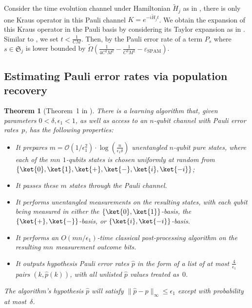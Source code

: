 \documentclass[twocolumn,superscriptaddress,aps,showpacs,amsmath,amstex,amssymb,citeautoscript,floatfix,pra,preprintnumbers]{revtex4-2}
\newcounter{alg}
\newtheorem{theorem}{Theorem}
\theoremstyle{plain}
\theoremstyle{plain}
\theoremstyle{plain}
\theoremstyle{plain}
\theoremstyle{plain}
\theoremstyle{plain}
\begin{document}
\begin{appendix}
Consider the time evolution channel under Hamiltonian $\tilde{H}_j$ as in , there is only one Kraus operator in this Pauli channel $K=e^{-i\tilde{H}_jt}$. We obtain the expansion of this Kraus operator in the Pauli basis by considering its Taylor expansion as in . Similar to , we set $t < \frac{1}{CM}$. Then, by  the Pauli error rate of a term $P_s$ where $s\in\mathfrak{S}_j$ is lower bounded by $\widetilde{\Omega}(\frac{1}{4C^2M^2} - \frac{1}{C^3M^2}-\varepsilon_{\mathrm{SPAM}})$.


\subsection{Estimating Pauli error rates via population recovery}
\label{sec:population_recovery}
\begin{theorem}[Theorem~1 in \cite{Flammia2021paulierror}]
\label{thm:intro-pop}
    There is a learning algorithm that, given parameters $0 < \delta, \epsilon_{1} < 1$, as well as access to an $n$-qubit channel with Pauli error rates~$p$, has the following properties:
    \begin{itemize}
        \item It prepares $m = \mathcal{O}(1/\epsilon_1^2)\cdot \log(\frac{n}{\epsilon_{1} \delta})$ unentangled $n$-qubit pure states, where each of the $mn$ $1$-qubits states is chosen uniformly at random from $\{\ket{0}, \ket{1}, \ket{+}, \ket{-}, \ket{i}, \ket{-i}\}$;
        \item It passes these $m$ states through the Pauli channel.
        \item It performs unentangled measurements on the resulting states, with each qubit being measured in either the $\{\ket{0}, \ket{1}\}$-basis, the $\{\ket{+}, \ket{-}\}$-basis, or $\{\ket{i}, \ket{-i}\}$-basis.
        \item It performs an $O(mn/\epsilon_1)$-time classical post-processing algorithm on the resulting $mn$ measurement outcome bits.
        \item It outputs hypothesis Pauli error rates $\widehat{p}$ in the form of a list of at most $\frac{4}{\epsilon_1}$ pairs $(k, \widehat{p}(k))$, with all unlisted $\widehat{p}$ values treated as~$0$.
    \end{itemize}
    The algorithm's hypothesis $\widehat{p}$ will satisfy $\|\widehat{p} - p\|_\infty \leq \epsilon_1$ except with probability at most~$\delta$.
\end{theorem}


\end{appendix}
\end{document}
